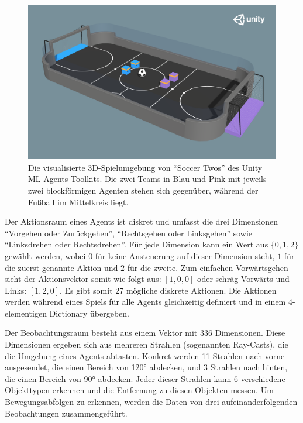 \documentclass[twocolumn]{webofc}
\begin{document}
\begin{figure}
  \centering
  \includegraphics[width=\columnwidth]{img/soccer_twos.png}
  \caption{Die visualisierte 3D-Spielumgebung von \enquote{Soccer Twos} des Unity \ac{ML}-Agents Toolkits. Die zwei Teams in Blau und Pink mit jeweils zwei blockförmigen Agenten stehen sich gegenüber, während der Fußball im Mittelkreis liegt. \cite{juliani2020}}
  \label{fig:eval}
\end{figure}

Der Aktionsraum eines Agents ist diskret und umfasst die drei Dimensionen \enquote{Vorgehen oder Zurückgehen}, \enquote{Rechtsgehen oder Linksgehen} sowie \enquote{Linksdrehen oder Rechtsdrehen}. Für jede Dimension kann ein Wert aus \(\{0,1, 2\}\) gewählt werden, wobei \(0\) für keine Ansteuerung auf dieser Dimension steht, \(1\) für die zuerst genannte Aktion und \(2\) für die zweite. Zum einfachen Vorwärtsgehen sieht der Aktionsvektor somit wie folgt aus: \([1, 0, 0]\) oder schräg Vorwärts und Links: \([1, 2, 0]\). Es gibt somit 27 mögliche diskrete Aktionen.
Die Aktionen werden während eines Spiels für alle Agents gleichzeitig definiert und in einem 4-elementigen Dictionary übergeben.

Der Beobachtungsraum besteht aus einem Vektor mit 336 Dimensionen. Diese Dimensionen ergeben sich aus mehreren Strahlen (sogenannten Ray-Casts), die die Umgebung eines Agents abtasten. Konkret werden 11 Strahlen nach vorne ausgesendet, die einen Bereich von 120° abdecken, und 3 Strahlen nach hinten, die einen Bereich von 90° abdecken. Jeder dieser Strahlen kann 6 verschiedene Objekttypen erkennen und die Entfernung zu diesen Objekten messen. Um Bewegungsabfolgen zu erkennen, werden die Daten von drei aufeinanderfolgenden Beobachtungen zusammengeführt. %
\end{document}
